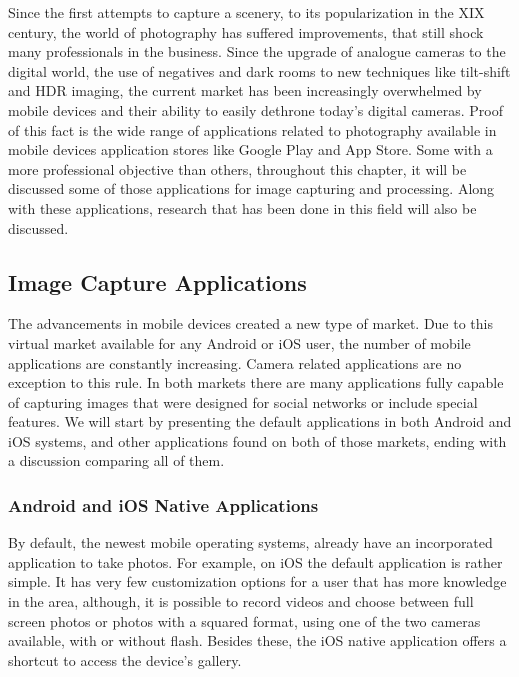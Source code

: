 Since the first attempts to capture a scenery, to its popularization in the XIX century, the world of photography has suffered improvements, that still shock many professionals in the business. Since the upgrade of analogue cameras to the digital world, the use of negatives and dark rooms to new techniques like tilt-shift and HDR imaging, the current market has been increasingly overwhelmed by mobile devices and their ability to easily dethrone today's digital cameras. Proof of this fact is the wide range of applications related to photography available in mobile devices application stores like Google Play and App Store. Some with a more professional objective than others, throughout this chapter, it will be discussed some of those applications for image capturing and processing. Along with these applications, research that has been done in this field will also be discussed.

\subsection{Image Capture Applications}

The advancements in mobile devices created a new type of market. Due to this virtual market available for any Android or iOS user, the number of mobile applications are constantly increasing. Camera related applications are no exception to this rule. In both markets there are many applications fully capable of capturing images that were designed for social networks or include special features. We will start by presenting the default applications in both Android and iOS systems, and other applications found on both of those markets, ending with a discussion comparing all of them.

\subsubsection{Android and iOS Native Applications}

By default, the newest mobile operating systems, already have an incorporated application to take photos. For example, on iOS the default application is rather simple. It has very few customization options for a user that has more knowledge in the area, although, it is possible to record videos and choose between full screen photos or photos with a squared format, using one of the two cameras available, with or without flash. Besides these, the iOS native application offers a shortcut to access the device's gallery.

